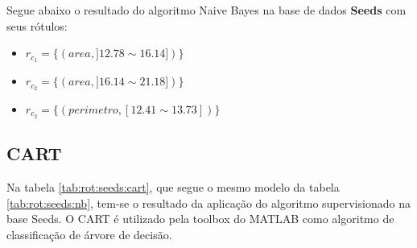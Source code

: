 

Segue abaixo o resultado do algoritmo Naive Bayes na base de dados \textbf{Seeds} com seus rótulos: 
\begin{itemize}[noitemsep]
 \item ${r_{c_1}=\{ (area, ]12.78 \sim 16.14]) \} }$  
 \item ${r_{c_2}=\{ (area, ]16.14 \sim 21.18]) \} }$
 \item ${r_{c_3}=\{ (perimetro, [12.41 \sim 13.73])\} }$
\end{itemize}


\subsection{CART}\label{cap:resultados:ssec:seed:cart}

Na tabela \ref{tab:rot:seeds:cart}, que segue o mesmo modelo da tabela \ref{tab:rot:seeds:nb}, tem-se o resultado da aplicação do algoritmo supervisionado na base Seeds. O CART é utilizado pela toolbox do MATLAB como algoritmo de classificação de árvore de decisão. 

